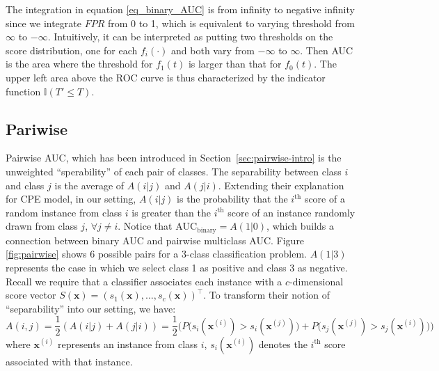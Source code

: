 \documentclass[twoside,11pt]{article}
\renewcommand{\>}{{\rightarrow}}
\newcommand{\1}{{\mathbf 1}}
\newcommand{\0}{{\mathbf 0}}
\begin{document}
The integration in equation \ref{eq_binary_AUC} is from infinity to negative infinity since we integrate $FPR$ from 0 to 1, which is equivalent to varying threshold from $\infty$ to $-\infty$. Intuitively, it can be interpreted as putting two thresholds on the score distribution, one for each $f_i(\cdot)$ and both vary from $-\infty$ to $\infty$. Then AUC is the area where the threshold for $f_1(t)$ is larger than that for $f_0(t)$. The upper left area above the ROC curve is thus characterized by the indicator function $\mathbb{I}(T' \leq T)$.

\subsection{Pariwise}
  Pairwise AUC, which has been introduced in Section~\ref{sec:pairwise-intro} is the unweighted ``sperability'' of each pair of classes. The separability between class $i$ and class $j$ is the average of $A(i|j)$ and $A(j|i)$. Extending their explanation for CPE model, in our setting, $A(i|j)$ is the probability that the $i^{\text{th}}$ score of a random instance from class $i$ is greater than the $i^{\text{th}}$ score of an instance randomly drawn from class $j$, $\forall j \neq i$. Notice that $\text{AUC}_{\text{binary}} = A(1|0)$, which builds a connection between binary AUC and pairwise multiclass AUC. Figure \ref{fig:pairwise} shows 6 possible pairs for a 3-class classification problem. $A(1|3)$ represents the case in which we select class 1 as positive and class 3 as negative.  Recall we require that a classifier associates each instance with a $c$-dimensional score vector $S(\textbf{x}) = (s_1(\textbf{x}), \dots, s_c(\textbf{x}))^{\top}$. To transform their notion of ``separability'' into our setting, we have:
\begin{equation}
    A(i,j) = \frac{1}{2}(A(i|j) + A(j|i)) = \frac{1}{2}\Big( P\big(s_i(\mathbf{x}^{(i)}) > s_i(\mathbf{x}^{(j)})\big) + P\big(s_j(\mathbf{x}^{(j)}) > s_j(\mathbf{x}^{(i)})\big) \Big)
\end{equation}
where $\mathbf{x}^{(i)}$ represents an instance from class $i$, $s_i(\mathbf{x}^{(i)})$ denotes the $i^{\text{th}}$ score associated with that instance.
\end{document}
